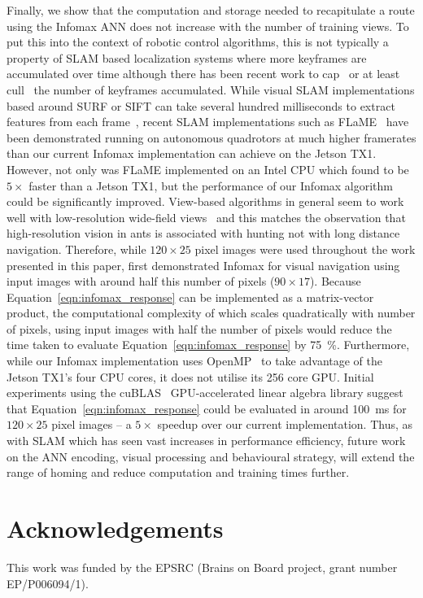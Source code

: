 \documentclass[letterpaper]{article}
\begin{document}
Finally, we show that the computation and storage needed to recapitulate a route using the Infomax ANN does not increase with the number of training views.
To put this into the context of robotic control algorithms, this is not typically a property of SLAM based localization systems where more keyframes are accumulated over time although there has been recent work to cap~\citep{Maddern2012} or at least cull~\citep{Mur-Artal2015} the number of keyframes accumulated.
While visual SLAM implementations based around SURF or SIFT can take several hundred milliseconds to extract features from each frame~\citep{Bay2006}, recent SLAM implementations such as FLaME~\citep{Greene2017} have been demonstrated running on autonomous quadrotors at much higher framerates than our current Infomax implementation can achieve on the Jetson TX1.
However, not only was FLaME implemented on an Intel CPU which \citet{Biddulph2018} found to be $5\times$ faster than a Jetson TX1, but the performance of our Infomax algorithm could be significantly improved.
View-based algorithms in general seem to work well with low-resolution wide-field views~\citep{Wystrach2016} and this matches the observation that high-resolution vision in ants is associated with hunting not with long distance navigation.
Therefore, while $120 \times 25$ pixel images were used throughout the work presented in this paper, \citet{Baddeley2012} first demonstrated Infomax for visual navigation using input images with around half this number of pixels ($90\times 17$).
Because Equation~\ref{eqn:infomax_response} can be implemented as a matrix-vector product, the computational complexity of which scales quadratically with number of pixels, using input images with half the number of pixels would reduce the time taken to evaluate Equation~\ref{eqn:infomax_response} by \SI{75}{\percent}. 
Furthermore, while our Infomax implementation uses OpenMP~\citep{Dagum1998} to take advantage of the Jetson TX1's four CPU cores, it does not utilise its \num{256} core GPU.
Initial experiments using the cuBLAS~\citep{NVIDIACorporation2007} GPU-accelerated linear algebra library suggest that Equation~\ref{eqn:infomax_response} could be evaluated in around \SI{100}{\milli\second} for $120 \times 25$ pixel images -- a $5 \times$ speedup over our current implementation.
Thus, as with SLAM which has seen vast increases in performance efficiency, future work on the ANN encoding, visual processing and behavioural strategy, will extend the range of homing and reduce computation and training times further.

\section{Acknowledgements}
This work was funded by the EPSRC (Brains on Board project, grant number EP/P006094/1).

\small

\end{document}
